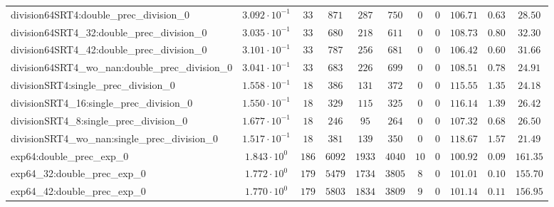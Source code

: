 \begin{tabular}{|l|c|c|c|c|c|c|c|c|c|c|}
division64SRT4:double\_prec\_division\_0                  & $ 3.092 \cdot 10^{-1} $ & $ 33     $ & $ 871    $ & $ 287   $ & $ 750   $ & $ 0   $ & $ 0    $ & $ 106.71      $ & $ 0.63    $ & $ 28.50   $ \\
division64SRT4\_32:double\_prec\_division\_0              & $ 3.035 \cdot 10^{-1} $ & $ 33     $ & $ 680    $ & $ 218   $ & $ 611   $ & $ 0   $ & $ 0    $ & $ 108.73      $ & $ 0.80    $ & $ 32.30   $ \\
division64SRT4\_42:double\_prec\_division\_0              & $ 3.101 \cdot 10^{-1} $ & $ 33     $ & $ 787    $ & $ 256   $ & $ 681   $ & $ 0   $ & $ 0    $ & $ 106.42      $ & $ 0.60    $ & $ 31.66   $ \\
division64SRT4\_wo\_nan:double\_prec\_division\_0         & $ 3.041 \cdot 10^{-1} $ & $ 33     $ & $ 683    $ & $ 226   $ & $ 699   $ & $ 0   $ & $ 0    $ & $ 108.51      $ & $ 0.78    $ & $ 24.91   $ \\
divisionSRT4:single\_prec\_division\_0                    & $ 1.558 \cdot 10^{-1} $ & $ 18     $ & $ 386    $ & $ 131   $ & $ 372   $ & $ 0   $ & $ 0    $ & $ 115.55      $ & $ 1.35    $ & $ 24.18   $ \\
divisionSRT4\_16:single\_prec\_division\_0                & $ 1.550 \cdot 10^{-1} $ & $ 18     $ & $ 329    $ & $ 115   $ & $ 325   $ & $ 0   $ & $ 0    $ & $ 116.14      $ & $ 1.39    $ & $ 26.42   $ \\
divisionSRT4\_8:single\_prec\_division\_0                 & $ 1.677 \cdot 10^{-1} $ & $ 18     $ & $ 246    $ & $ 95    $ & $ 264   $ & $ 0   $ & $ 0    $ & $ 107.32      $ & $ 0.68    $ & $ 26.50   $ \\
divisionSRT4\_wo\_nan:single\_prec\_division\_0           & $ 1.517 \cdot 10^{-1} $ & $ 18     $ & $ 381    $ & $ 139   $ & $ 350   $ & $ 0   $ & $ 0    $ & $ 118.67      $ & $ 1.57    $ & $ 21.49   $ \\
exp64:double\_prec\_exp\_0                                & $ 1.843 \cdot 10^{0}  $ & $ 186    $ & $ 6092   $ & $ 1933  $ & $ 4040  $ & $ 10  $ & $ 0    $ & $ 100.92      $ & $ 0.09    $ & $ 161.35  $ \\
exp64\_32:double\_prec\_exp\_0                            & $ 1.772 \cdot 10^{0}  $ & $ 179    $ & $ 5479   $ & $ 1734  $ & $ 3805  $ & $ 8   $ & $ 0    $ & $ 101.01      $ & $ 0.10    $ & $ 155.70  $ \\
exp64\_42:double\_prec\_exp\_0                            & $ 1.770 \cdot 10^{0}  $ & $ 179    $ & $ 5803   $ & $ 1834  $ & $ 3809  $ & $ 9   $ & $ 0    $ & $ 101.14      $ & $ 0.11    $ & $ 156.95  $ \\

\end{tabular}

